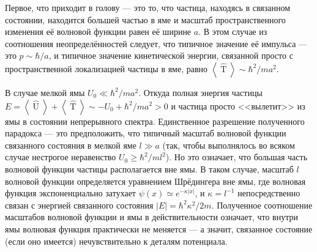 \documentclass[a4paper]{article}
\begin{document}
\begin{sol}
Первое, что приходит в голову --- это то, что частица, находясь
в связанном состоянии, находится большей частью в яме
и масштаб пространственного изменения её волновой функции
равен её ширине $a$. В этом случае из соотношения
неопределённостей следует, что типичное значение её импульса
--- это $p \sim \hbar /a$, и типичное значение кинетической
энергии, связанной просто с пространственной локализацией
частицы в яме, равно $\left<\widehat{\operatorname{T}} \right>
 \sim \hbar^2 /ma^2$.

В случае мелкой ямы $U_0 \ll \hbar^2 /ma^2$. Откуда полная
энергия частицы $E = \left<\widehat{\operatorname{U}} \right>+
 \left<\widehat{\operatorname{T}} \right>\sim  -U_0 +\hbar^2 /ma^2>0$ и частица просто <<вылетит>> из ямы в состоянии непрерывного
спектра. Единственное разрешение полученного парадокса
--- это предположить, что типичный масштаб волновой функции
связанного состояния в мелкой яме $l\gg a$ (так, чтобы выполнялось
во всяком случае нестрогое неравенство $U_0\ge \hbar^2 /ml^2$).
Но это означает, что большая часть волновой функции частицы
располагается вне ямы. В таком случае, масштаб $l$ волновой
функции определяется уравнением Шрёдингера вне ямы, где
волновая функция экспоненциально затухает $\psi(x) \simeq e
 ^{-\kappa |x|}$, и $\kappa =l^{-1}$ непосредственно связан
с энергией связанного состояния $|E|= \hbar^2 \kappa^2 /2m$.
Полученное соотношение масштабов волновой функции и ямы в
действительности означает, что внутри ямы волновая функция
практически не меняется --- а значит, связанное состояние
(если оно имеется) нечувствительно к деталям потенциала.


\end{sol}
\end{document}
